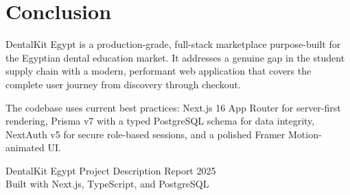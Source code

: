 \documentclass[12pt, a4paper]{article}
\begin{document}
\section{Conclusion}

DentalKit Egypt is a production-grade, full-stack marketplace purpose-built for the Egyptian dental education market. It addresses a genuine gap in the student supply chain with a modern, performant web application that covers the complete user journey from discovery through checkout.

The codebase uses current best practices: Next.js 16 App Router for server-first rendering, Prisma v7 with a typed PostgreSQL schema for data integrity, NextAuth v5 for secure role-based sessions, and a polished Framer Motion-animated UI.

\vfill
\begin{center}
\small\color{gray}
DentalKit Egypt \textperiodcentered{} Project Description Report \textperiodcentered{} 2025 \\
Built with Next.js, TypeScript, and PostgreSQL
\end{center}
\end{document}
